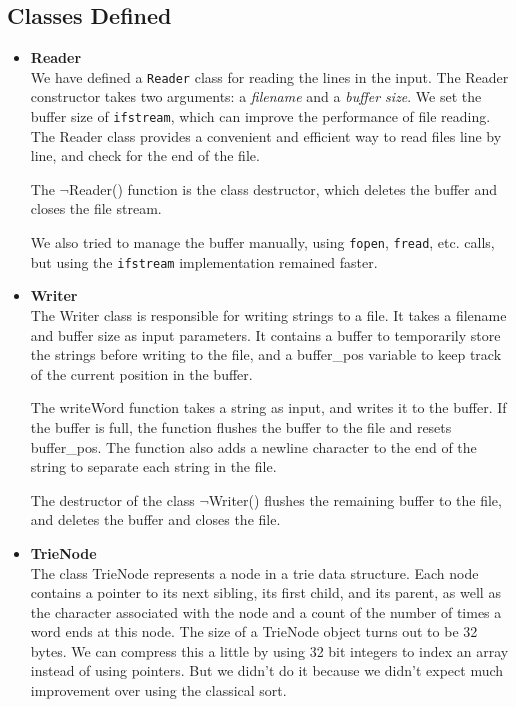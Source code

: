 \documentclass{article}
\begin{document}
    \subsection{Classes Defined}
        \begin{itemize}
            \item \textbf{Reader} \\ 
                We have defined a \verb|Reader| class for reading the lines in the input. The Reader constructor takes two arguments: a \emph{filename} and a \emph{buffer size}. We set the buffer size of \verb|ifstream|, which can improve the performance of file reading. The Reader class provides a convenient and efficient way to read files line by line, and check for the end of the file.
                
                The $\neg$Reader() function is the class destructor, which deletes the buffer and closes the file stream.
                
                We also tried to manage the buffer manually, using \verb|fopen|, \verb|fread|, etc. calls, but using the \verb|ifstream| implementation remained faster.
                
            \item \textbf{Writer} \\
                The Writer class is responsible for writing strings to a file. It takes a filename and buffer size as input parameters. It contains a buffer to temporarily store the strings before writing to the file, and a buffer\_pos variable to keep track of the current position in the buffer.
            
                The writeWord function takes a string as input, and writes it to the buffer. If the buffer is full, the function flushes the buffer to the file and resets buffer\_pos. The function also adds a newline character to the end of the string to separate each string in the file.
                
                The destructor of the class $\neg$Writer() flushes the remaining buffer to the file, and deletes the buffer and closes the file.
            \item \textbf{TrieNode} \\ 
                The class TrieNode represents a node in a trie data structure. Each node contains a pointer to its next sibling, its first child, and its parent, as well as the character associated with the node and a count of the number of times a word ends at this node. The size of a TrieNode object turns out to be 32 bytes. We can compress this a little by using 32 bit integers to index an array instead of using pointers. But we didn't do it because we didn't expect much improvement over using the classical sort.
            

\end{itemize}
\end{document}
